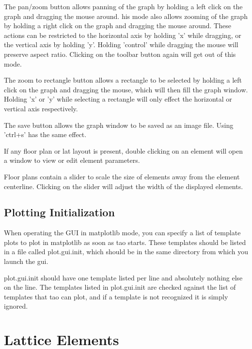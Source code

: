 The pan/zoom button allows panning of the graph by holding a left click on the graph and dragging the mouse around. his mode also allows zooming of the graph by holding a right click on the graph and dragging the mouse around. These actions can be restricted to the horizontal axis by holding 'x' while dragging, or the vertical axis by holding 'y'. Holding 'control' while dragging the mouse will preserve aspect ratio. Clicking on the toolbar button again will get out of this mode.

The zoom to rectangle button allows a rectangle to be selected by holding a left click on the graph and dragging the mouse, which will then fill the graph window. Holding 'x' or 'y' while selecting a rectangle will only effect the horizontal or vertical axis respectively.

The save button allows the graph window to be saved as an image file. Using 'ctrl+s' has the same effect.

If any floor plan or lat layout is present, double clicking on an element will open a window to view or edit element parameters.

Floor plans contain a slider to scale the size of elements away from the element centerline. Clicking on the slider will adjust the width of the displayed elements.

\subsection{Plotting Initialization}
\label{s:gui.plot.init}

When operating the GUI in matplotlib mode, you can specify a list of template plots to plot in matplotlib as soon as tao starts.  These templates should be listed in a file called plot.gui.init, which should be in the same directory from which you launch the gui.

plot.gui.init should have one template listed per line and absolutely nothing else on the line.  The templates listed in plot.gui.init are checked against the list of templates that tao can plot, and if a template is not recognized it is simply ignored.


\section{Lattice Elements}
\label{s:gui.lat}

